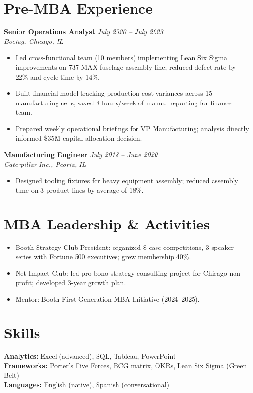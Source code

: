 \documentclass[11pt,a4paper]{article}
\begin{document}
\section{Pre-MBA Experience}

\noindent\textbf{Senior Operations Analyst} \hfill \textit{July 2020 -- July 2023}\\
\textit{Boeing, Chicago, IL}
\begin{itemize}
  \item Led cross-functional team (10 members) implementing Lean Six Sigma improvements on 737 MAX fuselage assembly line; reduced defect rate by 22\% and cycle time by 14\%.
  \item Built financial model tracking production cost variances across 15 manufacturing cells; saved 8 hours/week of manual reporting for finance team.
  \item Prepared weekly operational briefings for VP Manufacturing; analysis directly informed \$35M capital allocation decision.
\end{itemize}

\vspace{4pt}
\noindent\textbf{Manufacturing Engineer} \hfill \textit{July 2018 -- June 2020}\\
\textit{Caterpillar Inc., Peoria, IL}
\begin{itemize}
  \item Designed tooling fixtures for heavy equipment assembly; reduced assembly time on 3 product lines by average of 18\%.
\end{itemize}

\section{MBA Leadership \& Activities}
\begin{itemize}
  \item Booth Strategy Club President: organized 8 case competitions, 3 speaker series with Fortune 500 executives; grew membership 40\%.
  \item Net Impact Club: led pro-bono strategy consulting project for Chicago non-profit; developed 3-year growth plan.
  \item Mentor: Booth First-Generation MBA Initiative (2024--2025).
\end{itemize}

\section{Skills}
\textbf{Analytics:} Excel (advanced), SQL, Tableau, PowerPoint\\
\textbf{Frameworks:} Porter's Five Forces, BCG matrix, OKRs, Lean Six Sigma (Green Belt)\\
\textbf{Languages:} English (native), Spanish (conversational)
\end{document}

